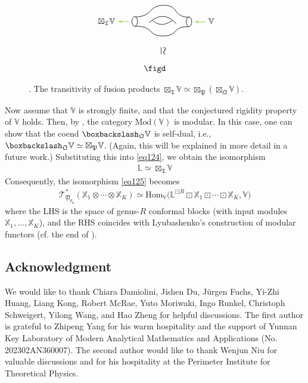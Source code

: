 \documentclass[11pt,b5paper,notitlepage]{article}
\theoremstyle{definition}
\theoremstyle{plain}
\newcommand{\fk}{\mathfrak}
\newcommand{\Hom}{\mathrm{Hom}}
\newcommand{\mbb}{\mathbb}
\newcommand{\blt}{\bullet}
\newcommand{\Vbb}{\mathbb V}
\newcommand{\Xbb}{\mathbb X}
\newcommand{\<}{\left\langle}
\renewcommand{\>}{\right\rangle}
\newcommand{\ST}{\mathscr{T}}
\newcommand{\bbs}{\boxbackslash}
\newcommand{\fq}{{\mathfrak Q}}
\newcommand{\Mod}{\mathrm{Mod}}
\newcommand{\fp}{\mathfrak{P}}
\newcommand{\fy}{\mathfrak{Y}}
\numberwithin{equation}{section}
\begin{document}
\begin{figure}[h]

	\centering
\begin{gather*}
\figc\\
\qquad\rotatebox{-90}{\scalebox{1.3}{$\simeq$}~~}\\
\figd
\end{gather*}


	\caption{. The transitivity of fusion products $\boxtimes_{\fk T}\Vbb\simeq\boxtimes_\fp(\boxtimes_\fq\Vbb)$.}
	\label{fig5}
\end{figure} 



Now assume that $\Vbb$ is strongly finite, and that the conjectured rigidity property of $\Vbb$ holds. Then, by \cite{McR21-rational}, the category $\Mod(\Vbb)$ is modular. In this case, one can show that the coend $\bbs_\fq\Vbb$ is self-dual, i.e., $\bbs_\fq\Vbb\simeq\boxtimes_\fp\Vbb$. (Again, this will be explained in more detail in a future work.) Substituting this into \eqref{eq124}, we obtain the isomorphism
\begin{align*}
\mbb L\simeq\boxtimes_{\fk T}\Vbb
\end{align*}
Consequently, the isomorphism \eqref{eq125} becomes
\begin{align}\label{eq126}
\ST^*_{\fy_{p_\blt}}(\Xbb_1\otimes\cdots\otimes\Xbb_K)\simeq\Hom_\Vbb\big(\mbb L^{\boxdot R}\boxdot\Xbb_1\boxdot\cdots\boxdot\Xbb_K,\Vbb\big)
\end{align}
where the LHS is the space of genus-$R$ conformal blocks (with input modules $\Xbb_1,\dots,\Xbb_K$), and the RHS coincides with Lyubashenko's construction of modular functors (cf. the end of \cite[Sec. 8.2]{Lyu96-Ribbon}). 






\subsection*{Acknowledgment}



We would like to thank Chiara Damiolini, Jishen Du, J\"urgen Fuchs, Yi-Zhi Huang, Liang Kong, Robert McRae, Yuto Moriwaki, Ingo Runkel, Christoph Schweigert, Yilong Wang, and Hao Zheng for helpful discussions. The first author is grateful to Zhipeng Yang for his warm hospitality and the support of Yunnan Key Laboratory of Modern Analytical Mathematics and Applications (No. 202302AN360007). The second author would like to thank Wenjun Niu for valuable discussions and for his hospitality at the Perimeter Institute for Theoretical Physics.
\end{document}
